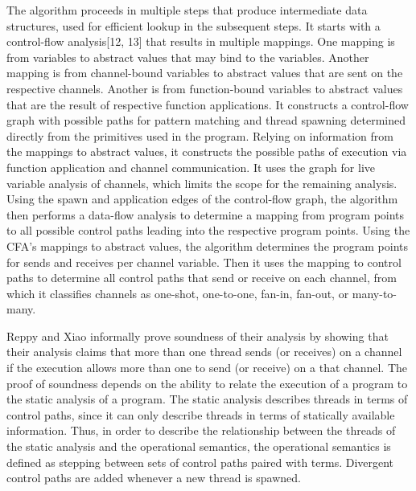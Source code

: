 \documentclass{article}
\begin{document}
The algorithm proceeds in multiple steps that produce intermediate data structures, used for
efficient lookup in the subsequent steps.  It starts with a control-flow analysis[12, 13] that
results in multiple mappings. One mapping is from variables to abstract values that may bind to
the variables.  Another mapping is from channel-bound variables to abstract values that are
sent on the respective channels.  Another is from function-bound variables to abstract values
that are the result of respective function applications.  It constructs a control-flow graph 
with possible paths for pattern matching and thread spawning determined directly from the
primitives used in the program.  Relying on information from the mappings to abstract values,
it constructs the possible paths of execution via function application and channel
communication.  It uses the graph for live variable analysis of channels, which limits the
scope for the remaining analysis.  Using the spawn and application edges of the control-flow
graph, the algorithm then performs a data-flow analysis to determine a mapping from program
points to all possible control paths leading into the respective program points.  Using the
CFA's mappings to abstract values, the algorithm determines the program points for sends and
receives per channel variable.  Then it uses the mapping to control paths to determine all
control paths that send or receive on each channel, from which it classifies channels as
one-shot, one-to-one, fan-in, fan-out, or many-to-many.

Reppy and Xiao informally prove soundness of their analysis by showing that their analysis
claims that more than one thread sends (or receives) on a channel if the execution allows more
than one to send (or receive) on a that channel.  The proof of soundness depends on the
ability to relate the execution of a program to the static analysis of a program.  The static
analysis describes threads in terms of control paths, since it can only describe threads in
terms of statically available information. Thus, in order to describe the relationship between
the threads of the static analysis and the operational semantics, the operational semantics is
defined as stepping between sets of control paths paired with terms.  Divergent control paths
are added whenever a new thread is spawned.
\end{document}
